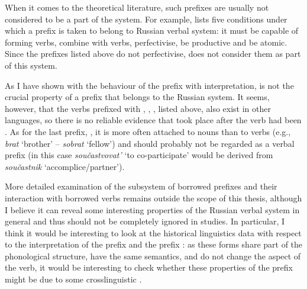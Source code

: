 When it comes to the theoretical literature, such prefixes are usually not considered to be a part of the system. For example, \citet[101-105]{Krongauz:98} lists five conditions under which a prefix is taken to belong to Russian verbal  system: it must be capable of forming verbs, combine with verbs, perfectivise, be productive and be atomic. Since the prefixes listed above do not perfectivise, \citet[103]{Krongauz:98} does not consider them as part of this system.

As I have shown with the behaviour of the prefix  with  interpretation,  is not the crucial property of a prefix that belongs to the Russian  system. It seems, however, that the verbs prefixed with , , , listed above, also exist in other languages, so there is no reliable evidence that  took place after the verb had been . As for the last prefix, , it is more often attached to nouns than to verbs (e.g., \textit{brat} `brother' -- \textit{sobrat} `fellow') and should probably not be regarded as a verbal prefix (in this case \textit{sou\v{c}astvovat'} `to co-participate' would be derived from \textit{sou\v{c}astnik} `accomplice/partner'). 

More detailed examination of the subsystem of borrowed prefixes and their interaction with borrowed verbs remains outside the scope of this thesis, although I believe it can reveal some interesting properties of the Russian verbal  system in general and thus should not be completely ignored in  studies. In particular, I think it would be interesting to look at the historical linguistics data with respect to the  interpretation of the prefix  and the  prefix : as these forms share part of the phonological structure, have the same semantics, and do not change the aspect of the verb, it would be interesting to check whether these properties of the  prefix  might be due to some crosslinguistic . 


